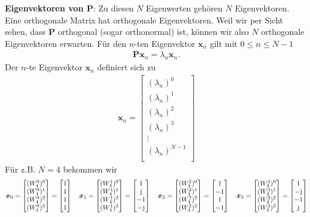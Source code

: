 \textbf{Eigenvektoren von $\bm{P}$}:
Zu diesen $N$ Eigenwerten gehören $N$ Eigenvektoren. Eine orthogonale
Matrix hat orthogonale Eigenvektoren. Weil wir per Sicht sehen, dass
$\bm{P}$ orthogonal (sogar orthonormal) ist, können wir also $N$ orthogonale
Eigenvektoren erwarten.
Für den $n$-ten Eigenvektor $\bm{x}_n$ gilt mit $0\leq n \leq N-1$
\begin{align}
\bm{P} \bm{x}_n = \lambda_n \bm{x}_n.
\end{align}
Der $n$-te Eigenvektor $\bm{x}_n$ definiert sich zu
\begin{align}
\bm{x}_n =
\begin{bmatrix}
(\lambda_n)^0\\
(\lambda_n)^1\\
(\lambda_n)^2\\
(\lambda_n)^3\\
\vdots\\
(\lambda_n)^{N-1}\\
\end{bmatrix}
\end{align}
%
Für z.B. $N=4$ bekommen wir
\begin{align}
\bm{x}_0 =
\begin{bmatrix}
(W_4^0)^0\\
(W_4^0)^1\\
(W_4^0)^2\\
(W_4^0)^3
\end{bmatrix}
=
\begin{bmatrix}
1\\1\\1\\1
\end{bmatrix}
\quad
\bm{x}_1 =
\begin{bmatrix}
(W_4^1)^0\\
(W_4^1)^1\\
(W_4^1)^2\\
(W_4^1)^3
\end{bmatrix}
=
\begin{bmatrix}
1\\\im\\-1\\-\im
\end{bmatrix}\quad
\bm{x}_2 =
\begin{bmatrix}
(W_4^2)^0\\
(W_4^2)^1\\
(W_4^2)^2\\
(W_4^2)^3
\end{bmatrix}
=
\begin{bmatrix}
1\\-1\\1\\-1
\end{bmatrix}\quad
\bm{x}_3 =
\begin{bmatrix}
(W_4^3)^0\\
(W_4^3)^1\\
(W_4^3)^2\\
(W_4^3)^3
\end{bmatrix}
=
\begin{bmatrix}
1\\-\im\\-1\\\im
\end{bmatrix}
\end{align}
